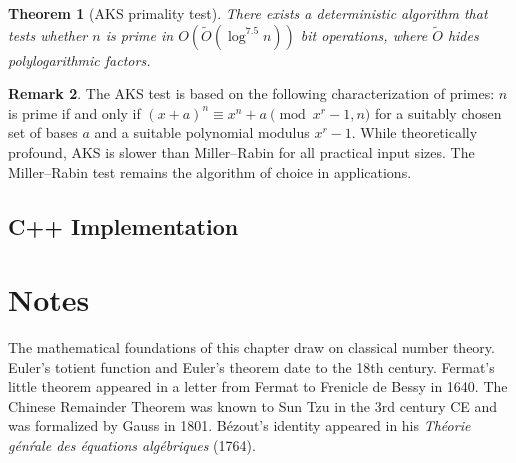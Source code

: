\documentclass[twoside,12pt]{book}
\theoremstyle{plain}
\newtheorem{theorem}{Theorem}[chapter]
\theoremstyle{definition}
\newtheorem{remark}[theorem]{Remark}
\theoremstyle{remark}
\begin{document}
\begin{theorem}[AKS primality test]
\label{thm:aks}
There exists a deterministic algorithm that tests whether $n$ is prime in $O(\tilde{O}(\log^{7.5} n))$ bit operations, where $\tilde{O}$ hides polylogarithmic factors.
\end{theorem}

\begin{remark}
The AKS test is based on the following characterization of primes: $n$ is prime if and only if $(x + a)^n \equiv x^n + a \pmod{x^r - 1, n}$ for a suitably chosen set of bases $a$ and a suitable polynomial modulus $x^r - 1$. While theoretically profound, AKS is slower than Miller--Rabin for all practical input sizes. The Miller--Rabin test remains the algorithm of choice in applications.
\end{remark}


\subsection*{C++ Implementation}







\section*{Notes}
\label{sec:notes-14}

The mathematical foundations of this chapter draw on classical number theory. Euler's totient function and Euler's theorem date to the 18th century. Fermat's little theorem appeared in a letter from Fermat to Frenicle de Bessy in 1640. The Chinese Remainder Theorem was known to Sun Tzu in the 3rd century CE and was formalized by Gauss in 1801. B\'ezout's identity appeared in his \emph{Th\'eorie g\'en\'rale des \'equations alg\'ebriques} (1764).
\end{document}
